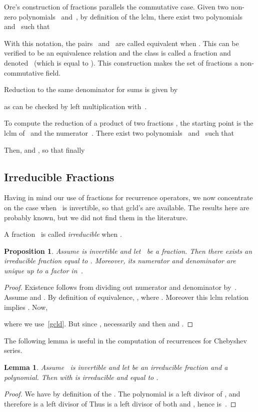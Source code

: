 \documentclass{amsart}
\newtheorem{lemma}{Lemma}
\newtheorem{prop}{Proposition}
\theoremstyle{definition}
\begin{document}
Ore's construction of fractions parallels the commutative case.
Given two non-zero polynomials~ and~, by definition of the lclm, there exist two polynomials~ and~ such that

With this notation, the pairs~ and~ are called equivalent when
.
This can be verified to be an equivalence relation and the class is called a fraction and denoted~ (which is equal to ). This construction makes the set of fractions a non-commutative field. 

Reduction to the same denominator for sums is given by

as can be checked by left multiplication with~. 

To compute the reduction of a product of two fractions , the starting point is the lclm of~ and the numerator~. There exist two polynomials~ and~ such that

Then,  and , so that finally


\subsection{Irreducible Fractions}
Having in mind our use of fractions for recurrence operators, we now concentrate on the case when~ is invertible, so that gcld's are available. The results here are probably known, but we did not find them in the literature.

A fraction~ is called \emph{irreducible} when .
\begin{prop}
Assume  is invertible and let~ be a fraction. Then there exists an irreducible fraction equal to . Moreover, its numerator and denominator are unique up to a factor in~.
\end{prop}
\begin{proof}
Existence follows from dividing out numerator and denominator by~. 
Assume  and  . 
By definition of equivalence, , where . Moreover this lclm relation implies .
Now,

where we use~\eqref{gcld}. But since , necessarily  and then
 and .
\end{proof}

The following lemma is useful in the computation of recurrences for Chebyshev series.
\begin{lemma} \label{lemirred}
Assume~ is invertible and let  be an irreducible fraction and  a polynomial. Then  with  is irreducible and equal to .
\end{lemma}
\begin{proof}
We have   by definition of the .
The polynomial  is a left divisor of , and therefore is a left divisor of  Thus  is a left divisor of both  and , hence is~.
\end{proof}
\end{document}
